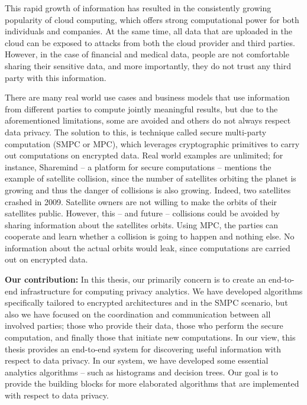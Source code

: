

This rapid growth of information has resulted in the consistently growing popularity of cloud computing, which offers strong computational power for both individuals and companies.
At the same time, all data that are uploaded in the cloud can be exposed to attacks from both the cloud provider and third parties.
However, in the case of financial and medical data, people are not comfortable sharing their sensitive data, and more importantly, they do not trust any third party with this information.

There are many real world use cases and business models that use information from different parties to compute jointly meaningful results, but due to the aforementioned limitations, some are avoided and others do not always respect data privacy.
The solution to this, is technique called secure multi-party computation (SMPC or MPC), which leverages cryptographic primitives to carry out computations on encrypted data.
Real world examples are unlimited; for instance, Sharemind -- a platform for secure computations -- mentions the example of satellite collision, since the number of satellites orbiting the planet is growing and thus the danger of collisions is also growing.
Indeed, two satellites crashed in 2009.
Satellite owners are not willing to make the orbits of their satellites public.
However, this -- and future -- collisions could be avoided by sharing information about the satellites orbits.
Using MPC, the parties can cooperate and learn whether a collision is going to happen and nothing else.
No information about the actual orbits would leak, since computations are carried out on encrypted data.



\textbf{Our contribution:} In this thesis, our primarily concern is to create an end-to-end infrastructure for computing privacy analytics.
We have developed algorithms specifically tailored to encrypted architectures and in the SMPC scenario, but also we have focused on the coordination and communication between all involved parties; those who provide their data, those who perform the secure computation, and finally those that initiate new computations.
In our view, this thesis provides an end-to-end system for discovering useful information with respect to data privacy.
In our system, we have developed some essential analytics algorithms -- such as histograms and decision trees.
Our goal is to provide the building blocks for more elaborated algorithms that are implemented with respect to data privacy.





